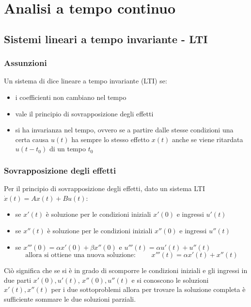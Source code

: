 \section{Analisi a tempo continuo}
\subsection{Sistemi lineari a tempo invariante - LTI}
\subsubsection*{Assunzioni}
Un sistema di dice lineare a tempo invariante (LTI) se:
\begin{itemize}
	\item i coefficienti non cambiano nel tempo
	\item vale il principio di sovrapposizione degli effetti
	\item si ha invarianza nel tempo, ovvero se a partire dalle stesse condizioni una certa causa \(u(t)\) ha sempre lo stesso
	effetto \(x(t)\) anche se viene ritardata \(u(t-t_0)\) di un tempo \(t_0\)
\end{itemize}

\subsubsection*{Sovrapposizione degli effetti}
Per il principio di sovrapposizione degli effetti, dato un sistema LTI \(\dot{x}(t) = Ax(t) + Bu(t)\):
\begin{itemize}
	\item se \(x'(t)\) è soluzione per le condizioni iniziali \(x'(0)\) e ingressi \(u'(t)\)
	\item se \(x''(t)\) è soluzione per le condizioni iniziali \(x''(0)\) e ingressi \(u''(t)\)
	\item se \(x'''(0) = \alpha x'(0) + \beta x''(0)\) e \(u'''(t) = \alpha u'(t) + u''(t)\)
	\[\text{allora si ottiene una nuova soluzione: } \qquad x'''(t) = \alpha x'(t) + x''(t)\]
\end{itemize}
Ciò significa che se si è in grado di scomporre le condizioni iniziali e gli ingressi in due parti \(x'(0),u'(t)\), \(x''(0),u''(t)\)
e si conoscono le soluzioni \(x'(t),x''(t)\) per i due sottoproblemi allora per trovare la soluzione completa è sufficiente
sommare le due soluzioni parziali.


